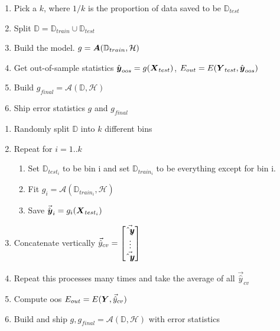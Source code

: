 \documentclass[12pt]{article}
\newcommand{\D}{\mathbb{D}}
\newcommand{\calA}{\mathcal{A}}
\newcommand{\calH}{\mathcal{H}}
\begin{document}
\begin{enumerate}

 
\begin{enumerate}
\item Pick a $k$, where $1/k$ is the proportion of data saved to be $\D_{test}$
\item Split $\D=\D_{train}\cup\D_{test}$
\item Build the model. $g=\A(\D_{train}, \calH)$
\item Get out-of-sample statistics $\hat{\boldsymbol{y}}_{oos}=g(\boldsymbol{X}_{test})$, $E_{out}=E(\boldsymbol{Y}_{test}, \hat{\boldsymbol{y}}_{oos})$
\item Build $g_{final}=\calA(\D, \calH)$
\item Ship error statistics $g$ and $g_{final}$
\end{enumerate}


\begin{enumerate}
\item Randomly split $\D$ into $k$ different bins
\item Repeat for $i={1..k}$
	\begin{enumerate}
	\item Set $\D_{test_i}$ to be bin i and set $\D_{train_i}$ to be everything except for bin i.
    \item Fit $g_i=\calA(\D_{train_i}, \calH)$
    \item Save $\vec{\hat{\boldsymbol{y}}}_i=g_i(\boldsymbol{X}_{test_i})$
	\end{enumerate}
\item Concatenate vertically $\vec{\hat{y}}_{cv}=\begin{bmatrix}
\vec{\hat{\boldsymbol{y}}_1} \\ \vdots \\\vec{\hat{\boldsymbol{y}}_k}\end{bmatrix}$ 
\item Repeat this processes many times and take the average of all $\vec{\hat{y}}_{cv}$
\item Compute oos $E_{out}=E(\boldsymbol{Y}, \vec{\hat{y}}_{cv})$
\item Build and ship $g, g_{final}=\calA(\D, \calH)$ with error statistics
\end{enumerate}


\end{enumerate}
\end{document}

